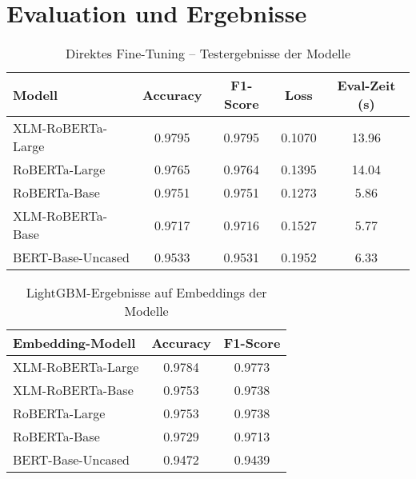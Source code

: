 \chapter{Evaluation und Ergebnisse}
\label{chap:evaluation_und_ergebnisse}


\begin{table}[!ht]
\centering
\begin{tabular}{lcccc}
    \toprule
    \textbf{Modell} & \textbf{Accuracy} & \textbf{F1-Score} & \textbf{Loss} & \textbf{Eval-Zeit (s)} \\
    \midrule
    XLM-RoBERTa-Large & 0.9795 & 0.9795 & 0.1070 & 13.96 \\
    RoBERTa-Large     & 0.9765 & 0.9764 & 0.1395 & 14.04 \\
    RoBERTa-Base      & 0.9751 & 0.9751 & 0.1273 & 5.86 \\
    XLM-RoBERTa-Base  & 0.9717 & 0.9716 & 0.1527 & 5.77 \\
    BERT-Base-Uncased & 0.9533 & 0.9531 & 0.1952 & 6.33 \\
    \bottomrule
\end{tabular}
\caption{Direktes Fine-Tuning – Testergebnisse der Modelle}
\end{table}


\begin{table}[!ht]
\centering
\begin{tabular}{lcc}
    \toprule
    \textbf{Embedding-Modell} & \textbf{Accuracy} & \textbf{F1-Score} \\
    \midrule
    XLM-RoBERTa-Large & 0.9784 & 0.9773 \\
    XLM-RoBERTa-Base  & 0.9753 & 0.9738 \\
    RoBERTa-Large     & 0.9753 & 0.9738 \\
    RoBERTa-Base      & 0.9729 & 0.9713 \\
    BERT-Base-Uncased & 0.9472 & 0.9439 \\
    \bottomrule
\end{tabular}
\caption{LightGBM-Ergebnisse auf Embeddings der Modelle}
\end{table}


